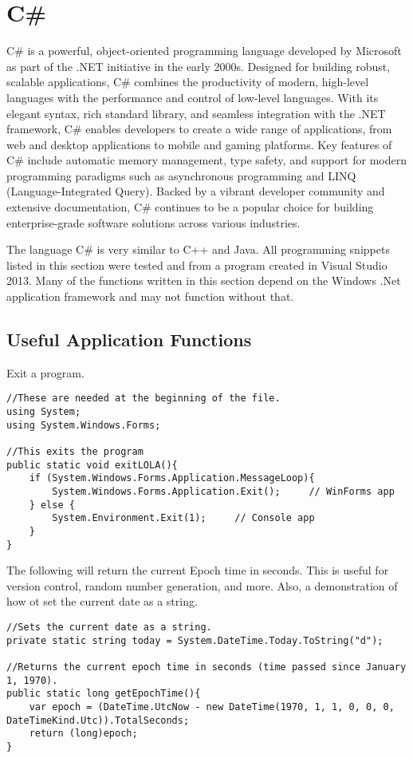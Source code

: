 \chapter{C\#}
\thispagestyle{fancy}
\lstset{}\lstset{language=[Sharp]C, style=csharpstyle}

C\# is a powerful, object-oriented programming language developed by Microsoft as part of the .NET initiative in the early 2000s. Designed for building robust, scalable applications, C\# combines the productivity of modern, high-level languages with the performance and control of low-level languages. With its elegant syntax, rich standard library, and seamless integration with the .NET framework, C\# enables developers to create a wide range of applications, from web and desktop applications to mobile and gaming platforms. Key features of C\# include automatic memory management, type safety, and support for modern programming paradigms such as asynchronous programming and LINQ (Language-Integrated Query). Backed by a vibrant developer community and extensive documentation, C\# continues to be a popular choice for building enterprise-grade software solutions across various industries.

\myindent The language C\# is very similar to C++ and Java. All programming snippets listed in this section were tested and from a program created in Visual Studio 2013. Many of the functions written in this section depend on the Windows .Net application framework and may not function without that.

\section{Useful Application Functions}

Exit a program.
\begin{lstlisting}
//These are needed at the beginning of the file.
using System;
using System.Windows.Forms;

//This exits the program
public static void exitLOLA(){
	if (System.Windows.Forms.Application.MessageLoop){
		System.Windows.Forms.Application.Exit();     // WinForms app
	} else {
		System.Environment.Exit(1);     // Console app
	}
}
\end{lstlisting} 

The following will return the current Epoch time in seconds. This is useful for version control, random number generation, and more. Also, a demonstration of how ot set the current date as a string.
\begin{lstlisting}
//Sets the current date as a string.
private static string today = System.DateTime.Today.ToString("d");

//Returns the current epoch time in seconds (time passed since January 1, 1970).
public static long getEpochTime(){
	var epoch = (DateTime.UtcNow - new DateTime(1970, 1, 1, 0, 0, 0, DateTimeKind.Utc)).TotalSeconds;
	return (long)epoch;
}
\end{lstlisting}

